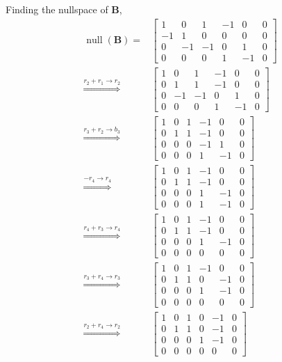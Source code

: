 \documentclass[]{article}
\numberwithin{equation}{section}
\begin{document}
Finding the nullspace of \(\mathbf{B}\), 
\begin{align}
	\operatorname{null}(\mathbf{B}) = 
	&\left[
	\begin{array}{ccccc|c}
	1 & 0 & 1 & -1 & 0 & 0 \\
	-1 & 1 & 0 & 0 & 0 & 0 \\
	0 & -1 & -1 & 0 & 1 & 0 \\
	0 & 0 & 0 & 1 & -1 & 0
	\end{array}
	\right] \\
	\overset{r_2 + r_1 \to r_2}{\Longrightarrow} &\left[
	\begin{array}{ccccc|c}
	1 & 0 & 1 & -1 & 0 & 0 \\
	0 & 1 & 1 & -1 & 0 & 0 \\
	0 & -1 & -1 & 0 & 1 & 0 \\
	0 & 0 & 0 & 1 & -1 & 0
	\end{array}
	\right] \\
	\overset{r_3 + r_2 \to b_3}{\Longrightarrow} &\left[
	\begin{array}{ccccc|c}
	1 & 0 & 1 & -1 & 0 & 0 \\
	0 & 1 & 1 & -1 & 0 & 0 \\
	0 & 0 & 0 & -1 & 1 & 0 \\
	0 & 0 & 0 & 1 & -1 & 0
	\end{array}
	\right] \\
	\overset{-r_4 \to r_4}{\Longrightarrow} &\left[
	\begin{array}{ccccc|c}
	1 & 0 & 1 & -1 & 0 & 0 \\
	0 & 1 & 1 & -1 & 0 & 0 \\
	0 & 0 & 0 & 1 & -1 & 0 \\
	0 & 0 & 0 & 1 & -1 & 0
	\end{array}
	\right] \\
	\overset{r_4 + r_3 \to r_4}{\Longrightarrow} &\left[
	\begin{array}{ccccc|c}
	1 & 0 & 1 & -1 & 0 & 0 \\
	0 & 1 & 1 & -1 & 0 & 0 \\
	0 & 0 & 0 & 1 & -1 & 0 \\
	0 & 0 & 0 & 0 & 0 & 0
	\end{array}
	\right] \\
	\overset{r_3 + r_4 \to r_3}{\Longrightarrow} &\left[
	\begin{array}{ccccc|c}
	1 & 0 & 1 & -1 & 0 & 0 \\
	0 & 1 & 1 & 0 & -1 & 0 \\
	0 & 0 & 0 & 1 & -1 & 0 \\
	0 & 0 & 0 & 0 & 0 & 0
	\end{array}
	\right] \\
	\overset{r_2 + r_4 \to r_2}{\Longrightarrow} &\left[
	\begin{array}{ccccc|c}
	1 & 0 & 1 & 0 & -1 & 0 \\
	0 & 1 & 1 & 0 & -1 & 0 \\
	0 & 0 & 0 & 1 & -1 & 0 \\
	0 & 0 & 0 & 0 & 0 & 0
	\end{array}
	\right]
\end{align}
\end{document}
